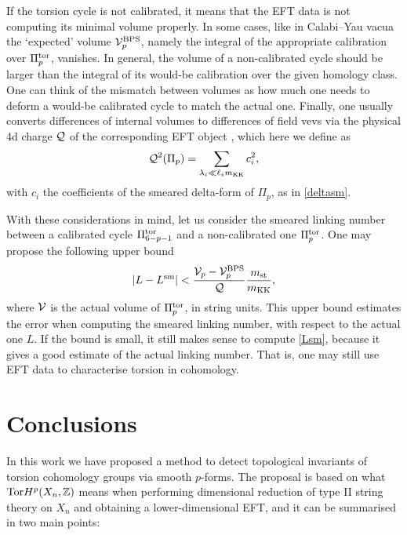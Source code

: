 \documentclass[11pt]{article}
\def\be{\begin{equation}}
\def\ee{\end{equation}}
\newcommand{\IZ}{\mathbb{Z}}
\begin{document}
If the torsion cycle is not calibrated, it means that the EFT data is not computing its minimal volume properly. In some cases, like in Calabi--Yau vacua the `expected' volume ${\cal V}_p^{\rm BPS}$, namely the integral of the appropriate calibration over $\Pi_p^{\rm tor}$,  vanishes. In general, the volume of a non-calibrated cycle should be larger than the integral of its would-be calibration over the given homology class. One can think of the mismatch between volumes as how much one needs to deform a would-be calibrated cycle to match the actual one. Finally, one usually converts differences of internal volumes to differences of field vevs via the physical 4d charge ${\cal Q}$ of the corresponding EFT object  \cite{Lanza:2021udy}, which here we define as 
\be
{\cal Q}^2(\Pi_p) = \sum_{\lambda_i \ll \ell_s m_{\rm KK}} c_i^2 ,
\label{physQ}
\ee
with $c_i$ the coefficients of the smeared delta-form of $\Pi_p$, as in \eqref{deltasm}.  

With these considerations in mind, let us consider the smeared linking number between a calibrated cycle $\Pi_{6-p-1}^{\rm tor}$ and a non-calibrated one $\Pi_p^{\rm tor}$. One may propose the following upper bound 
\be
\left| L- L^{\rm sm} \right| < \frac{{\cal V}
_p - {\cal V}_{p}^{\rm BPS}}{{\cal Q}} \frac{m_{\rm st}}{m_{\rm KK}} ,
\ee
where ${\cal V}$ is the actual volume of $\Pi_p^{\rm tor}$, in string units. This upper bound estimates the error when computing the smeared linking number, with respect to the actual one $L$. If the bound is small, it still makes sense to compute \eqref{Lsm}, because it gives a good estimate of the actual linking number. That is, one may still use EFT data to characterise torsion in cohomology.



\section{Conclusions}
\label{s:conclu}

In this work we have proposed a method to detect topological invariants of torsion cohomology groups via smooth $p$-forms. The proposal is based on what ${\rm Tor} H^p(X_n, \IZ)$ means when performing dimensional reduction of type II string theory on $X_n$ and obtaining a lower-dimensional EFT, and it can be summarised in two main points: 
\end{document}
